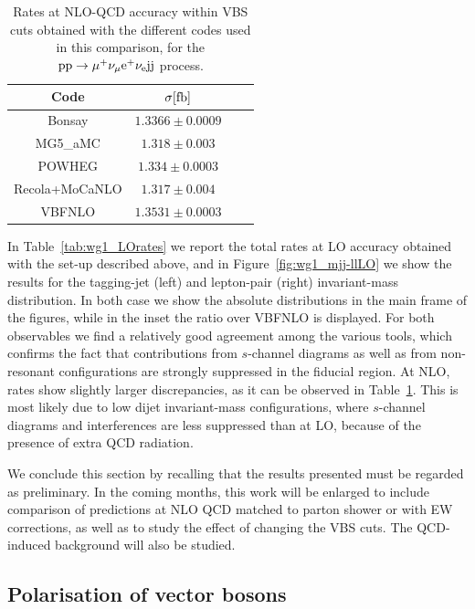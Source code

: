 \begin{table}[h!]
    \centering
    \begin{tabular}{c|c|c|c}
        Code  &  $\sigma[\rm{fb}]$  \\
        \hline
        \hline
        {\sc Bonsay}  &  $1.3366 \pm 0.0009$  \\
        {\sc MG5\_aMC}&  $1.318  \pm 0.003$  \\
        {\sc POWHEG}  &  $1.334 \pm 0.0003$  \\
        {\sc Recola+MoCaNLO}  &  $1.317 \pm 0.004 $ \\
        {\sc VBFNLO}  &  $1.3531 \pm 0.0003$  \\
    \end{tabular}
    \caption{\label{tab:wg1_NLOrates} Rates at NLO-QCD accuracy within VBS cuts obtained with the different codes used in this comparison, 
    for the ${\rm p}{\rm p}\to\mu^+\nu_\mu{\rm e}^+\nu_{\rm e}{\rm j}{\rm j}$ process.}
\end{table}
In Table~\ref{tab:wg1_LOrates} we report the total rates at LO accuracy obtained with the set-up described above, and in Figure~\ref{fig:wg1_mjj-llLO} we show the results
for the tagging-jet (left) and lepton-pair (right) invariant-mass distribution. In both case we show the absolute distributions in the main frame of the 
figures, while in the inset the ratio over {\sc VBFNLO} is displayed. For both observables we find 
a relatively good agreement among the various tools, which confirms the fact
that contributions from $s$-channel diagrams as well as from non-resonant configurations are strongly suppressed in the fiducial region.
At NLO, rates show slightly larger discrepancies, as it can be observed in Table~\ref{tab:wg1_NLOrates}. This is most likely due to low dijet invariant-mass configurations, where
$s$-channel diagrams and interferences are less suppressed than at LO, because of the presence of extra QCD radiation.

We conclude this section by recalling that the results presented must be regarded as preliminary.
In the coming months, this work will be enlarged to include comparison of predictions at NLO QCD matched to parton shower or with EW corrections, 
as well as to study the effect of changing 
the VBS cuts. The QCD-induced background will also be studied.

\subsection{Polarisation of vector bosons}

